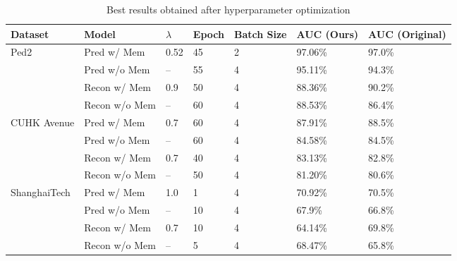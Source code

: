\begin{table}[]
\centering
\begin{tabular}{|l|l|l|l|l|l|l|}
\hline
\textbf{Dataset}              & \textbf{Model} & \textbf{$\lambda$} & \textbf{Epoch} & \textbf{Batch Size} & \textbf{AUC (Ours)} & \textbf{AUC (Original)} \\ \hline
\multirow{4}{*}{Ped2\cite{6739466}}         & Pred w/ Mem    & 0.52            & 45             & 2                   & 97.06\%            & 97.0\%                \\ \cline{2-7} 
                              & Pred w/o Mem   & --              & 55             & 4                   & 95.11\%            & 94.3\%                \\ \cline{2-7} 
                              & Recon w/ Mem   & 0.9             & 50             & 4                   & 88.36\%            & 90.2\%                \\ \cline{2-7} 
                              & Recon w/o Mem  & --              & 60             & 4                   & 88.53\%            & 86.4\%                \\ \hline
\multirow{4}{*}{CUHK Avenue\cite{6751449}}  & Pred w/ Mem    & 0.7             & 60             & 4                   & 87.91\%            & 88.5\%                \\ \cline{2-7} 
                              & Pred w/o Mem   & --              & 60             & 4                   & 84.58\%            & 84.5\%                \\ \cline{2-7} 
                              & Recon w/ Mem   & 0.7             & 40             & 4                   & 83.13\%            & 82.8\%                \\ \cline{2-7} 
                              & Recon w/o Mem  & --              & 50             & 4                   & 81.20\%            & 80.6\%                \\ \hline
\multirow{4}{*}{ShanghaiTech\cite{Luo2017ARO}} & Pred w/ Mem    & 1.0             & 1              & 4                   & 70.92\%            & 70.5\%                \\ \cline{2-7} 
                              & Pred w/o Mem   & --              & 10             & 4                   & 67.9\%             & 66.8\%                \\ \cline{2-7} 
                              & Recon w/ Mem   & 0.7             & 10             & 4                   & 64.14\%            & 69.8\%                \\ \cline{2-7} 
                              & Recon w/o Mem  & --              & 5              & 4                   & 68.47\%            & 65.8\%                \\ \hline
\end{tabular}
\caption{Best results obtained after hyperparameter optimization}
\label{tab:best-results}
\end{table}

